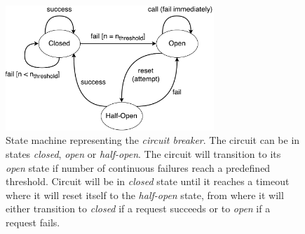 \begin{figure}[H]
\centering
\includegraphics[width=0.7\textwidth]{../media/CircuitBreakerState.pdf} 
\caption{State machine representing the \textit{circuit breaker}. The
	circuit can be in states \textit{closed}, \textit{open} or \textit{half-open}.
	The circuit will transition to its \textit{open} state if number of continuous
	failures reach a predefined threshold. Circuit will be in \textit{closed}
	state until it reaches a timeout where it will reset itself to the
	\textit{half-open} state, from where it will either transition to
	\textit{closed} if a request succeeds or to \textit{open} if a request fails.}
\label{fig:circuitbreakerstate}
\end{figure}

